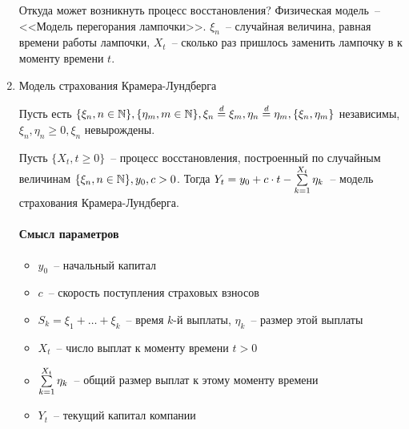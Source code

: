 \begin{enumerate}
Откуда может возникнуть процесс восстановления?
Физическая модель~-- <<Модель перегорания лампочки>>. $\xi_n$~-- случайная величина, равная времени работы лампочки, $X_t$~-- сколько раз пришлось заменить лампочку в к моменту времени $t$.

\item Модель страхования Крамера-Лундберга

Пусть есть $\{\xi_n, n \in \mathbb{N}\}, \{\eta_m, m \in \mathbb{N}\},
\xi_n \overset{d}{=} \xi_m,
\eta_n \overset{d}{=} \eta_m,
\{\xi_n, \eta_m\}$ независимы,
$\xi_n, \eta_n \geq 0, \xi_n$ невырождены.

Пусть $\{X_t, t \geq 0\}$~-- процесс восстановления, построенный по случайным величинам
$\{\xi_n, n \in \mathbb{N}\}, y_0, c > 0$. Тогда
$Y_t = y_0 + c \cdot t - \sum\limits_{k=1}^{X_t} \eta_k$~--
модель страхования Крамера-Лундберга.

\paragraph*{Смысл параметров}
\begin{itemize}
\item $y_0$~-- начальный капитал
\item $c$~-- скорость поступления страховых взносов
\item $S_k = \xi_1 + \dots + \xi_k$~-- время $k$-й выплаты, $\eta_k$~-- размер этой выплаты
\item $X_t$~-- число выплат к моменту времени $t > 0$
\item $\sum\limits_{k=1}^{X_t} \eta_k$~-- общий размер выплат к этому моменту времени
\item $Y_t$~-- текущий капитал компании
\end{itemize}
\end{enumerate}